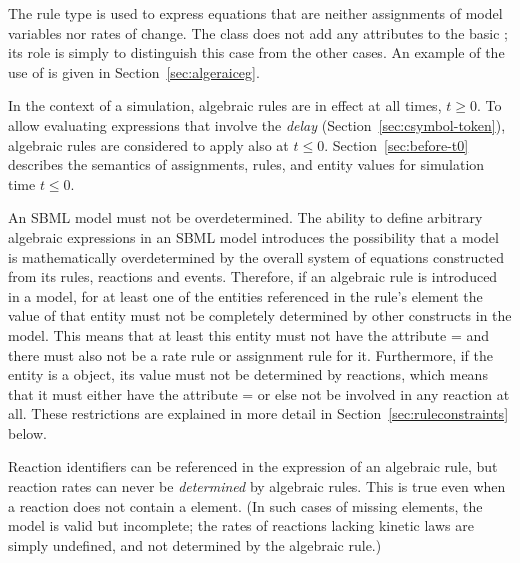 The rule type \AlgebraicRule is used to express equations that are
neither assignments of model variables nor rates of change.  The
\AlgebraicRule class does not add any attributes to the basic
\Rule; its role is simply to distinguish this case from the other
cases.  An example of the use of \AlgebraicRule is given in
Section~\ref{sec:algeraiceg}.

In the context of a simulation, algebraic rules are in effect at
all times, $t \geq 0$.  To allow evaluating expressions that
involve the \emph{delay} 
(Section~\ref{sec:csymbol-token}), algebraic rules are considered
to apply also at $t \leq 0$.  Section~\ref{sec:before-t0}
describes the semantics of assignments, rules, and entity values
for simulation time $t \leq 0$.

An SBML model must not be overdetermined.  The ability to define
arbitrary algebraic expressions in an SBML model introduces the
possibility that a model is mathematically overdetermined by the
overall system of equations constructed from its rules, reactions
and events.  Therefore, if an algebraic rule is introduced in a
model, for at least one of the entities referenced in the rule's
 element the value of that entity must not be
completely determined by other constructs in the model.  This
means that at least this entity must not have the attribute
= and there must also not be a rate rule
or assignment rule for it.  Furthermore, if the entity is a
\Species object, its value must not be determined by reactions,
which means that it must either have the attribute
= or else not be involved in
any reaction at all.  These restrictions are explained in more
detail in Section~\ref{sec:ruleconstraints} below.

Reaction identifiers can be referenced in the  
expression of an algebraic rule, but reaction rates can never be
\emph{determined} by algebraic rules.  This is true even when a
reaction does not contain a \KineticLaw element.  (In such cases
of missing \KineticLaw elements, the model is valid but 
incomplete; the rates of reactions lacking kinetic laws are
simply undefined, and not determined by the algebraic rule.)


\subsubsection{}
\label{sec:assignmentrule}

